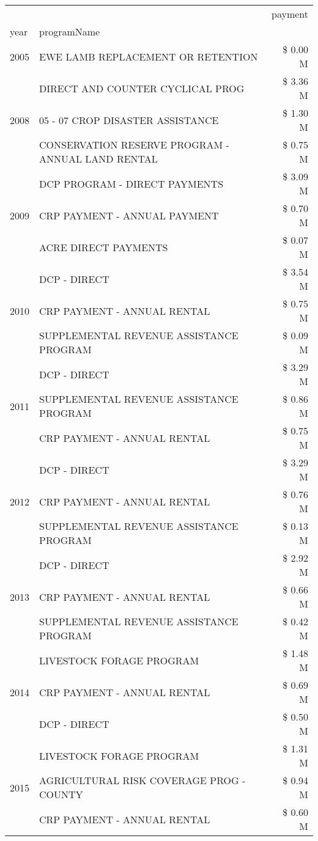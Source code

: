 \begin{tabular}{llr}
\toprule
 &  & payment \\
year & programName &  \\
\midrule
2005 & EWE LAMB REPLACEMENT OR RETENTION & \$ 0.00 M \\
\cline{1-3}
\multirow[t]{3}{*}{2008} & DIRECT AND COUNTER CYCLICAL PROG & \$ 3.36 M \\
 & 05 - 07 CROP DISASTER ASSISTANCE & \$ 1.30 M \\
 & CONSERVATION RESERVE PROGRAM - ANNUAL LAND RENTAL & \$ 0.75 M \\
\cline{1-3}
\multirow[t]{3}{*}{2009} & DCP PROGRAM - DIRECT PAYMENTS & \$ 3.09 M \\
 & CRP PAYMENT - ANNUAL PAYMENT & \$ 0.70 M \\
 & ACRE DIRECT PAYMENTS & \$ 0.07 M \\
\cline{1-3}
\multirow[t]{3}{*}{2010} & DCP - DIRECT & \$ 3.54 M \\
 & CRP PAYMENT - ANNUAL RENTAL & \$ 0.75 M \\
 & SUPPLEMENTAL REVENUE ASSISTANCE PROGRAM & \$ 0.09 M \\
\cline{1-3}
\multirow[t]{3}{*}{2011} & DCP - DIRECT & \$ 3.29 M \\
 & SUPPLEMENTAL REVENUE ASSISTANCE PROGRAM & \$ 0.86 M \\
 & CRP PAYMENT - ANNUAL RENTAL & \$ 0.75 M \\
\cline{1-3}
\multirow[t]{3}{*}{2012} & DCP - DIRECT & \$ 3.29 M \\
 & CRP PAYMENT - ANNUAL RENTAL & \$ 0.76 M \\
 & SUPPLEMENTAL REVENUE ASSISTANCE PROGRAM & \$ 0.13 M \\
\cline{1-3}
\multirow[t]{3}{*}{2013} & DCP - DIRECT & \$ 2.92 M \\
 & CRP PAYMENT - ANNUAL RENTAL & \$ 0.66 M \\
 & SUPPLEMENTAL REVENUE ASSISTANCE PROGRAM & \$ 0.42 M \\
\cline{1-3}
\multirow[t]{3}{*}{2014} & LIVESTOCK FORAGE PROGRAM & \$ 1.48 M \\
 & CRP PAYMENT - ANNUAL RENTAL & \$ 0.69 M \\
 & DCP - DIRECT & \$ 0.50 M \\
\cline{1-3}
\multirow[t]{3}{*}{2015} & LIVESTOCK FORAGE PROGRAM & \$ 1.31 M \\
 & AGRICULTURAL RISK COVERAGE PROG - COUNTY & \$ 0.94 M \\
 & CRP PAYMENT - ANNUAL RENTAL & \$ 0.60 M \\

\end{tabular}
